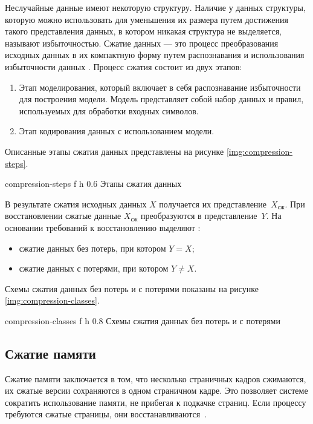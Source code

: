 Неслучайные данные имеют некоторую структуру. Наличие у данных структуры, которую можно использовать для уменьшения их размера путем достижения такого представления данных, в котором никакая структура не выделяется, называют избыточностью. Сжатие данных --- это процесс преобразования исходных данных в их компактную форму путем распознавания и использования избыточности данных \cite{compression-definition}. Процесс сжатия состоит из двух этапов:

\begin{enumerate}
	\item Этап моделирования, который включает в себя распознавание избыточности для построения модели. Модель представляет собой набор данных и правил, используемых для обработки входных символов.
	\item Этап кодирования данных с использованием модели.
\end{enumerate}

Описанные этапы сжатия данных представлены на рисунке \ref{img:compression-steps}.

    {compression-steps}
    {f}
    {h}
    {0.6\textwidth}
    {Этапы сжатия данных}

В результате сжатия исходных данных $X$ получается их представление~$X_{\text{сж}}$. При восстановлении сжатые данные $X_{\text{сж}}$ преобразуются в представление~$Y$. На основании требований к восстановлению выделяют \cite{compression-classes}:

\begin{itemize}
	\item сжатие данных без потерь, при котором $Y = X$;
	\item сжатие данных с потерями, при котором $Y \not= X$.
\end{itemize}

Схемы сжатия данных без потерь и с потерями показаны на рисунке \ref{img:compression-classes}.

    {compression-classes}
    {f}
    {h}
    {0.8\textwidth}
    {Схемы сжатия данных без потерь и с потерями}

\subsection{Сжатие памяти}

Сжатие памяти заключается в том, что несколько страничных кадров сжимаются, их сжатые версии сохраняются в одном страничном кадре. Это позволяет системе сократить использование памяти, не прибегая к подкачке страниц. Если процессу требуются сжатые страницы, они восстанавливаются~\cite{swapping}.

